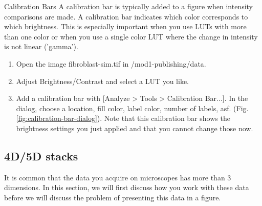 \begin{taskbox}{Calibration Bars}
A calibration bar is typically added to a figure when intensity comparisons are made. A calibration bar indicates which color corresponds to which brightness. This is especially important when you use LUTs with more than one color or when you use a single color LUT where the change in intensity is not linear ('gamma').

\begin{enumerate}
	\item Open the image fibroblast-sim.tif in /mod1-publishing/data. 
	\item Adjust Brightness/Contrast and select a LUT you like.
	\item Add a calibration bar with [Analyze > Tools > Calibration Bar...]. In the dialog, choose a location, fill color, label color, number of labels, asf. (Fig. \ref{fig:calibration-bar-dialog}). Note that this calibration bar shows the brightness settings you just applied and that you cannot change those now.	
	
	\begin{minipage}[t]{\linewidth}
		\begin{center}
		\medskip
		\label{fig:calibration-bar-dialog}
		\end{center}
	\end{minipage}
	
\end{enumerate}

\end{taskbox}

\subsection{4D/5D stacks}
It is common that the data you acquire on microscopes has more than 3 dimensions. In this section, we will first discuss how you work with these data before we will discuss the problem of presenting this data in a figure.

